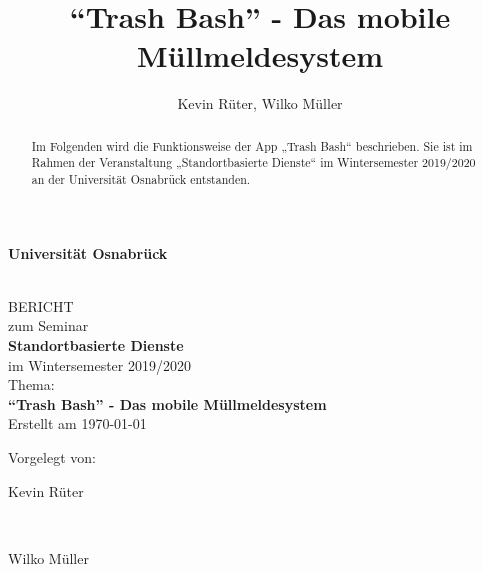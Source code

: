 \documentclass[a4paper, 11pt, DIV=11, listof=numbered, numbers=noenddot]{scrartcl}
\title{\enquote{Trash Bash} - Das mobile Müllmeldesystem}
\author{Kevin Rüter, Wilko Müller}
\begin{document}
	
	
	\begin{titlepage}
		\begin{center}
			\vspace*{1.5cm}
			\begin{Large}
				\textbf{Universit\"at Osnabr\"uck}
			\end{Large}
			
			\noindent\hrulefill
			\\[3.5cm]
			BERICHT \\[1cm]
			zum Seminar \\[1cm]
			\textbf{Standortbasierte Dienste} \\[1.5cm]    %
			im Wintersemester 2019/2020 \\[1.5cm]   %
			Thema: \\[0.5cm]
			\textbf{\enquote{Trash Bash} - Das mobile Müllmeldesystem} \\[2cm]        %
			Erstellt am \today
		\end{center}
		\vfill
		\begin{flushleft}
			Vorgelegt von: 
			\hfill \parbox{60mm}{Kevin Rüter} \\  %
			\hfill \parbox{60mm}{Wilko Müller}
		\end{flushleft}
	\end{titlepage}
	
	
	\newpage
	\tableofcontents 
	
	
	
	\newpage
	
	\maketitle
	
	\begin{abstract}
		\noindent Im Folgenden wird die Funktionsweise der App „Trash Bash“ beschrieben. 
			Sie ist im Rahmen der Veranstaltung „Standortbasierte Dienste“ im Wintersemester 2019/2020 an der Universität Osnabrück entstanden.
	\end{abstract}
\end{document}

